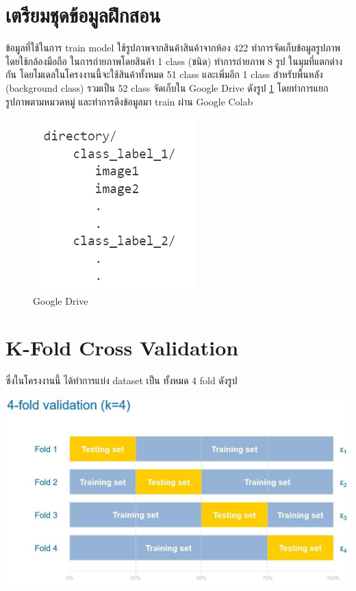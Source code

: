  

\section{เตรียมชุดข้อมูลฝึกสอน}
ข้อมูลที่ใช้ในการ train model ใช้รูปภาพจากสินค้าสินค้าจากห้อง 422  ทำการจัดเก็บข้อมูลรูปภาพ โดยใช้กล้องมือถือ
ในการถ่ายภาพโดยสินค้า 1 class (ชนิด) ทำการถ่ายภาพ 8 รูป ในมุมที่แตกต่างกัน  
โดยโมเดลในโครงงานนี้จะใช้สินค้าทั้งหมด 51 class และเพิ่มอีก 1 class สำหรับพื้นหลัง (background class)
รวมเป็น 52 class
จัดเก็บใน Google Drive ดังรูป  \ref{fig:Google Drive} โดยทำการแยก รูปภาพตามหมวดหมู่ และทำการดึงข้อมูลมา train ผ่าน Google Colab 
\begin{figure}[h]
  \begin{center}
   
  \includegraphics[scale=0.4]{pic/model/st.png}
  \end{center}
  
  \caption[Google Drive]{Google Drive}
  \label{fig:Google Drive}
  \end{figure}

\section{K-Fold Cross Validation}


 ซึ่งในโครงงานนี้ ได้ทำการแบ่ง dataset เป็น ทั้งหมด 4 fold ดังรูป

\begin{center}
  \includegraphics[scale=0.3]{pic/model/CrossValidation.png}\cite{CrossValidation}
  \end{center}

